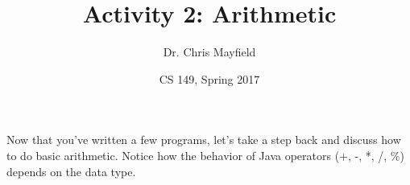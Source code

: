 \documentclass[12pt]{article}
\title{Activity 2: Arithmetic}
\author{Dr. Chris Mayfield}
\date{CS 149, Spring 2017}
\begin{document}
\maketitle

Now that you've written a few programs, let's take a step back and discuss how to do basic arithmetic.
Notice how the behavior of Java operators (+, -, *, /, \%) depends on the data type.


\newpage

\newpage

\end{document}
